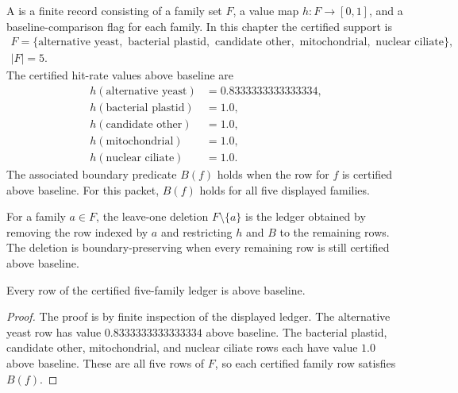 \begin{definition}
\label{def:bioreality-q-six-family-leave-one-boundary-ledger}
A \BioRealityQSixFamilyLeaveOneBoundaryLedgerUp is a finite record consisting of a family set $F$, a value map $h:F\to[0,1]$, and a baseline-comparison flag for each family.  In this chapter the certified support is
$$
\begin{gathered}
F=\{\text{alternative yeast},\text{ bacterial plastid},\text{ candidate other},\text{ mitochondrial},\text{ nuclear ciliate}\},\\
|F|=5.
\end{gathered}
$$
The certified hit-rate values above baseline are
$$
\begin{aligned}
h(\text{alternative yeast})&=0.8333333333333334,\\
h(\text{bacterial plastid})&=1.0,\\
h(\text{candidate other})&=1.0,\\
h(\text{mitochondrial})&=1.0,\\
h(\text{nuclear ciliate})&=1.0.
\end{aligned}
$$
The associated boundary predicate $B(f)$ holds when the row for $f$ is certified above baseline.  For this packet, $B(f)$ holds for all five displayed families.
\end{definition}

\begin{definition}
\label{def:bioreality-q-six-family-leave-one-deletion}
For a family $a\in F$, the leave-one deletion $F\setminus\{a\}$ is the ledger obtained by removing the row indexed by $a$ and restricting $h$ and $B$ to the remaining rows.  The deletion is boundary-preserving when every remaining row is still certified above baseline.
\end{definition}

\begin{lemma}
\label{lem:bioreality-q-six-family-all-rows-above-baseline}
Every row of the certified five-family ledger is above baseline.
\end{lemma}

\begin{proof}
The proof is by finite inspection of the displayed ledger.  The alternative yeast row has value $0.8333333333333334$ above baseline.  The bacterial plastid, candidate other, mitochondrial, and nuclear ciliate rows each have value $1.0$ above baseline.  These are all five rows of $F$, so each certified family row satisfies $B(f)$.
\end{proof}

